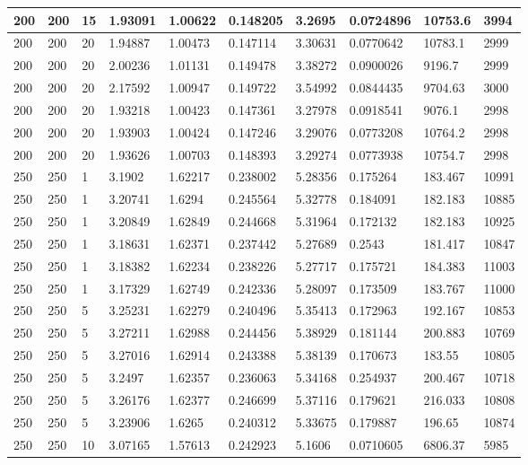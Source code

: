 \begin{landscape}
\begin{longtable}{ | l | l | l | l | l | l | l | l | l | l | }
200 & 200 & 15 & 1.93091 & 1.00622 & 0.148205 & 3.2695 & 0.0724896 & 10753.6 & 3994\\ \hline
200 & 200 & 20 & 1.94887 & 1.00473 & 0.147114 & 3.30631 & 0.0770642 & 10783.1 & 2999\\ \hline
200 & 200 & 20 & 2.00236 & 1.01131 & 0.149478 & 3.38272 & 0.0900026 & 9196.7 & 2999\\ \hline
200 & 200 & 20 & 2.17592 & 1.00947 & 0.149722 & 3.54992 & 0.0844435 & 9704.63 & 3000\\ \hline
200 & 200 & 20 & 1.93218 & 1.00423 & 0.147361 & 3.27978 & 0.0918541 & 9076.1 & 2998\\ \hline
200 & 200 & 20 & 1.93903 & 1.00424 & 0.147246 & 3.29076 & 0.0773208 & 10764.2 & 2998\\ \hline
200 & 200 & 20 & 1.93626 & 1.00703 & 0.148393 & 3.29274 & 0.0773938 & 10754.7 & 2998\\ \hline
250 & 250 & 1 & 3.1902 & 1.62217 & 0.238002 & 5.28356 & 0.175264 & 183.467 & 10991\\ \hline
250 & 250 & 1 & 3.20741 & 1.6294 & 0.245564 & 5.32778 & 0.184091 & 182.183 & 10885\\ \hline
250 & 250 & 1 & 3.20849 & 1.62849 & 0.244668 & 5.31964 & 0.172132 & 182.183 & 10925\\ \hline
250 & 250 & 1 & 3.18631 & 1.62371 & 0.237442 & 5.27689 & 0.2543 & 181.417 & 10847\\ \hline
250 & 250 & 1 & 3.18382 & 1.62234 & 0.238226 & 5.27717 & 0.175721 & 184.383 & 11003\\ \hline
250 & 250 & 1 & 3.17329 & 1.62749 & 0.242336 & 5.28097 & 0.173509 & 183.767 & 11000\\ \hline
250 & 250 & 5 & 3.25231 & 1.62279 & 0.240496 & 5.35413 & 0.172963 & 192.167 & 10853\\ \hline
250 & 250 & 5 & 3.27211 & 1.62988 & 0.244456 & 5.38929 & 0.181144 & 200.883 & 10769\\ \hline
250 & 250 & 5 & 3.27016 & 1.62914 & 0.243388 & 5.38139 & 0.170673 & 183.55 & 10805\\ \hline
250 & 250 & 5 & 3.2497 & 1.62357 & 0.236063 & 5.34168 & 0.254937 & 200.467 & 10718\\ \hline
250 & 250 & 5 & 3.26176 & 1.62377 & 0.246699 & 5.37116 & 0.179621 & 216.033 & 10808\\ \hline
250 & 250 & 5 & 3.23906 & 1.6265 & 0.240312 & 5.33675 & 0.179887 & 196.65 & 10874\\ \hline
250 & 250 & 10 & 3.07165 & 1.57613 & 0.242923 & 5.1606 & 0.0710605 & 6806.37 & 5985\\ \hline

\end{longtable}
\end{landscape}
